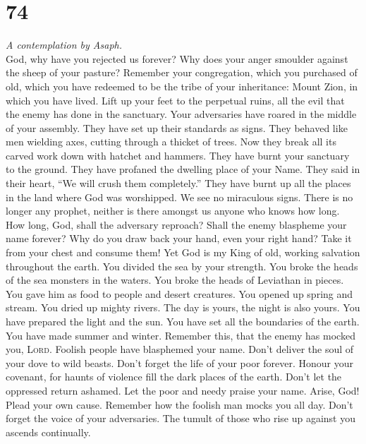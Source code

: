 \hypertarget{section-73}{%
\section{74}\label{section-73}}

\emph{A contemplation by Asaph.}\\
 God, why have you rejected us forever? Why does your
anger smoulder against the sheep of your pasture? 
Remember your congregation, which you purchased of old, which you have
redeemed to be the tribe of your inheritance: Mount Zion, in which you
have lived.  Lift up your feet to the perpetual ruins, all
the evil that the enemy has done in the sanctuary.  Your
adversaries have roared in the middle of your assembly. They have set up
their standards as signs.  They behaved like men wielding
axes, cutting through a thicket of trees.  Now they break
all its carved work down with hatchet and hammers.  They
have burnt your sanctuary to the ground. They have profaned the dwelling
place of your Name.  They said in their heart, ``We will
crush them completely.'' They have burnt up all the places in the land
where God was worshipped.  We see no miraculous signs.
There is no longer any prophet, neither is there amongst us anyone who
knows how long.  How long, God, shall the adversary
reproach? Shall the enemy blaspheme your name forever? 
Why do you draw back your hand, even your right hand? Take it from your
chest and consume them!  Yet God is my King of old,
working salvation throughout the earth.  You divided the
sea by your strength. You broke the heads of the sea monsters in the
waters.  You broke the heads of Leviathan in pieces. You
gave him as food to people and desert creatures.  You
opened up spring and stream. You dried up mighty rivers. 
The day is yours, the night is also yours. You have prepared the light
and the sun.  You have set all the boundaries of the
earth. You have made summer and winter.  Remember this,
that the enemy has mocked you, \textsc{Lord}. Foolish people have
blasphemed your name.  Don't deliver the soul of your
dove to wild beasts. Don't forget the life of your poor forever.
 Honour your covenant, for haunts of violence fill the
dark places of the earth.  Don't let the oppressed return
ashamed. Let the poor and needy praise your name.  Arise,
God! Plead your own cause. Remember how the foolish man mocks you all
day.  Don't forget the voice of your adversaries. The
tumult of those who rise up against you ascends continually.


